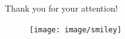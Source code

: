 \documentclass[10 pt]{beamer}
\begin{document}
\begin{frame}
\centering
\vspace*{1 cm}
\Huge Thank you for your attention!
\vspace*{2 cm}
\begin{figure}
\centering
\texttt{[image: image/smiley]}
\end{figure}
\end{frame}
%
\end{document}
